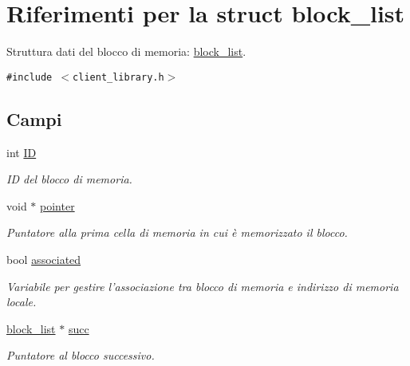 \hypertarget{structblock__list}{
\section{Riferimenti per la struct block\_\-list}
\label{structblock__list}
}
Struttura dati del blocco di memoria: \hyperlink{structblock__list}{block\_\-list}.  


{\tt \#include $<$client\_\-library.h$>$}

\subsection*{Campi}
\begin{CompactItemize}
\item 
int \hyperlink{structblock__list_ffcd96e737413a77caf6eb83ca18d5c1_ffcd96e737413a77caf6eb83ca18d5c1}{ID}
\begin{CompactList}\small\item\em ID del blocco di memoria. \item\end{CompactList}\item 
void $\ast$ \hyperlink{structblock__list_00f54f470b2a579aab495ee7f414ed97_00f54f470b2a579aab495ee7f414ed97}{pointer}
\begin{CompactList}\small\item\em Puntatore alla prima cella di memoria in cui è memorizzato il blocco. \item\end{CompactList}\item 
bool \hyperlink{structblock__list_1cd72fdc1de5c3d7e8b8f8da29a3dbfd_1cd72fdc1de5c3d7e8b8f8da29a3dbfd}{associated}
\begin{CompactList}\small\item\em Variabile per gestire l'associazione tra blocco di memoria e indirizzo di memoria locale. \item\end{CompactList}\item 
\hyperlink{structblock__list}{block\_\-list} $\ast$ \hyperlink{structblock__list_55fb1bd769461ad9b55a7ad08d959665_55fb1bd769461ad9b55a7ad08d959665}{succ}
\begin{CompactList}\small\item\em Puntatore al blocco successivo. \item\end{CompactList}\end{CompactItemize}


